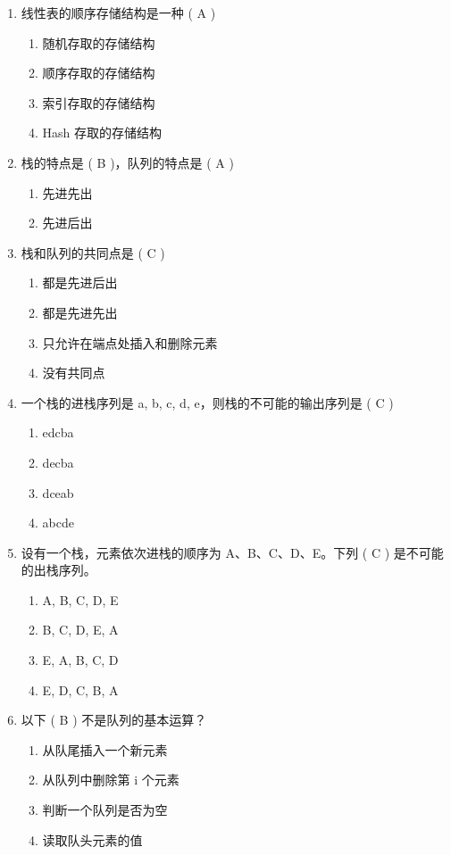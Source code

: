 \documentclass[12pt, a4paper]{article}
\begin{document}
\begin{enumerate}[label=\arabic*.]
    \item 线性表的顺序存储结构是一种 ( A )
    \begin{enumerate}
        \item 随机存取的存储结构
        \item 顺序存取的存储结构
        \item 索引存取的存储结构
        \item Hash 存取的存储结构
    \end{enumerate}

    \item 栈的特点是 ( B )，队列的特点是 ( A )
    \begin{enumerate}
        \item 先进先出
        \item 先进后出
    \end{enumerate}

    \item 栈和队列的共同点是 ( C )
    \begin{enumerate}
        \item 都是先进后出
        \item 都是先进先出
        \item 只允许在端点处插入和删除元素
        \item 没有共同点
    \end{enumerate}

    \item 一个栈的进栈序列是 a, b, c, d, e，则栈的不可能的输出序列是 ( C )
    \begin{enumerate}
        \item edcba
        \item decba
        \item dceab
        \item abcde
    \end{enumerate}

    \item 设有一个栈，元素依次进栈的顺序为 A、B、C、D、E。下列 ( C ) 是不可能的出栈序列。
    \begin{enumerate}
        \item A, B, C, D, E
        \item B, C, D, E, A
        \item E, A, B, C, D
        \item E, D, C, B, A
    \end{enumerate}

    \item 以下 ( B ) 不是队列的基本运算？
    \begin{enumerate}
        \item 从队尾插入一个新元素
        \item 从队列中删除第 i 个元素
        \item 判断一个队列是否为空
        \item 读取队头元素的值
    \end{enumerate}


\end{enumerate}
\end{document}
